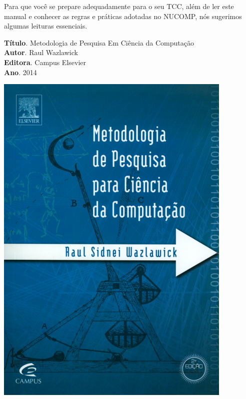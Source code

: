 Para que você se prepare adequadamente para o seu TCC, além de ler este manual e conhecer as regras e práticas adotadas no NUCOMP, nós sugerimos algumas leituras essenciais.

\noindent\begin{minipage}{0.8\textwidth}
\textbf{Título}. Metodologia de Pesquisa Em Ciência da Computação\\
\textbf{Autor}. Raul Wazlawick\\
\textbf{Editora}. Campus Elsevier\\
\textbf{Ano}. 2014\\
\end{minipage}\begin{minipage}{0.2\textwidth}
\includegraphics[width=\linewidth]{./img/wazlawick}
\end{minipage}


